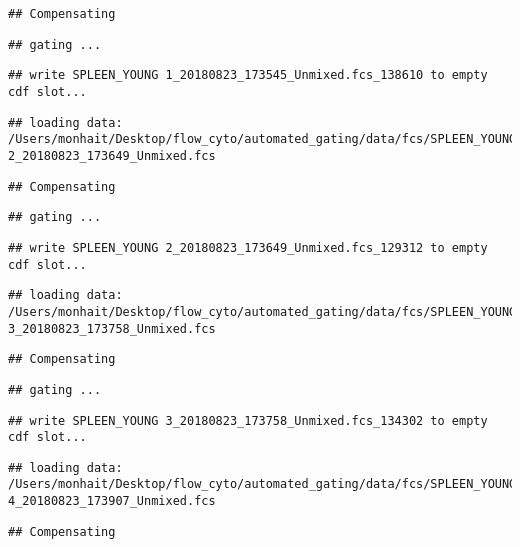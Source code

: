 \documentclass[]{book}
\begin{document}
\begin{verbatim}
## Compensating
\end{verbatim}

\begin{verbatim}
## gating ...
\end{verbatim}

\begin{verbatim}
## write SPLEEN_YOUNG 1_20180823_173545_Unmixed.fcs_138610 to empty cdf slot...
\end{verbatim}

\begin{verbatim}
## loading data: /Users/monhait/Desktop/flow_cyto/automated_gating/data/fcs/SPLEEN_YOUNG 2_20180823_173649_Unmixed.fcs
\end{verbatim}

\begin{verbatim}
## Compensating
\end{verbatim}

\begin{verbatim}
## gating ...
\end{verbatim}

\begin{verbatim}
## write SPLEEN_YOUNG 2_20180823_173649_Unmixed.fcs_129312 to empty cdf slot...
\end{verbatim}

\begin{verbatim}
## loading data: /Users/monhait/Desktop/flow_cyto/automated_gating/data/fcs/SPLEEN_YOUNG 3_20180823_173758_Unmixed.fcs
\end{verbatim}

\begin{verbatim}
## Compensating
\end{verbatim}

\begin{verbatim}
## gating ...
\end{verbatim}

\begin{verbatim}
## write SPLEEN_YOUNG 3_20180823_173758_Unmixed.fcs_134302 to empty cdf slot...
\end{verbatim}

\begin{verbatim}
## loading data: /Users/monhait/Desktop/flow_cyto/automated_gating/data/fcs/SPLEEN_YOUNG 4_20180823_173907_Unmixed.fcs
\end{verbatim}

\begin{verbatim}
## Compensating
\end{verbatim}
\end{document}
